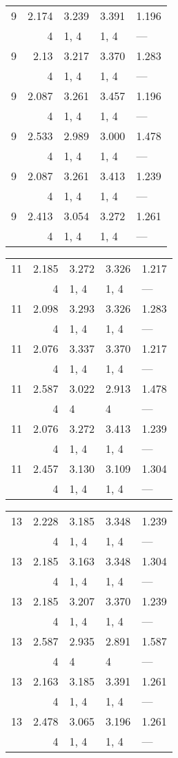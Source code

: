 \begin{tabular}{lrlll}
\toprule
 9 & 2.174 & 3.239 & 3.391 & 1.196 \\
   & 4     & 1, 4  & 1, 4  & ---   \\
 9 & 2.13  & 3.217 & 3.370 & 1.283 \\
   & 4     & 1, 4  & 1, 4  & ---   \\
 9 & 2.087 & 3.261 & 3.457 & 1.196 \\
   & 4     & 1, 4  & 1, 4  & ---   \\
 9 & 2.533 & 2.989 & 3.000 & 1.478 \\
   & 4     & 1, 4  & 1, 4  & ---   \\
 9 & 2.087 & 3.261 & 3.413 & 1.239 \\
   & 4     & 1, 4  & 1, 4  & ---   \\
 9 & 2.413 & 3.054 & 3.272 & 1.261 \\
   & 4     & 1, 4  & 1, 4  & ---   \\
\bottomrule
\end{tabular}
\begin{tabular}{lrlll}
\toprule
 11 & 2.185 & 3.272 & 3.326 & 1.217 \\
    & 4     & 1, 4  & 1, 4  & ---   \\
 11 & 2.098 & 3.293 & 3.326 & 1.283 \\
    & 4     & 1, 4  & 1, 4  & ---   \\
 11 & 2.076 & 3.337 & 3.370 & 1.217 \\
    & 4     & 1, 4  & 1, 4  & ---   \\
 11 & 2.587 & 3.022 & 2.913 & 1.478 \\
    & 4     & 4     & 4     & ---   \\
 11 & 2.076 & 3.272 & 3.413 & 1.239 \\
    & 4     & 1, 4  & 1, 4  & ---   \\
 11 & 2.457 & 3.130 & 3.109 & 1.304 \\
    & 4     & 1, 4  & 1, 4  & ---   \\
\bottomrule
\end{tabular}
\begin{tabular}{lrlll}
\toprule
 13 & 2.228 & 3.185 & 3.348 & 1.239 \\
    & 4     & 1, 4  & 1, 4  & ---   \\
 13 & 2.185 & 3.163 & 3.348 & 1.304 \\
    & 4     & 1, 4  & 1, 4  & ---   \\
 13 & 2.185 & 3.207 & 3.370 & 1.239 \\
    & 4     & 1, 4  & 1, 4  & ---   \\
 13 & 2.587 & 2.935 & 2.891 & 1.587 \\
    & 4     & 4     & 4     & ---   \\
 13 & 2.163 & 3.185 & 3.391 & 1.261 \\
    & 4     & 1, 4  & 1, 4  & ---   \\
 13 & 2.478 & 3.065 & 3.196 & 1.261 \\
    & 4     & 1, 4  & 1, 4  & ---   \\
\bottomrule
\end{tabular}
